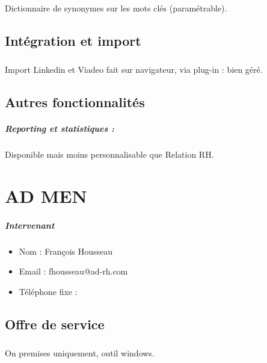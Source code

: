 \documentclass[12pt,twoside]{scrreprt}
\begin{document}
\paragraph{} Dictionnaire de synonymes sur les mots clés (paramétrable).


\section{Intégration et import}
\paragraph{} Import Linkedin et Viadeo fait sur navigateur, via plug-in : bien géré. 

\section{Autres fonctionnalités}

\paragraph{Reporting et statistiques :} Disponible mais moins personnalisable que Relation RH.




\chapter{AD MEN}

\paragraph{Intervenant}
\begin{itemize}
	\item Nom : François Housseau
	\item Email : fhousseau@ad-rh.com
	\item Téléphone fixe :
\end{itemize}


\section{Offre de service}
\paragraph{} On premises uniquement, outil windows.
\end{document}
